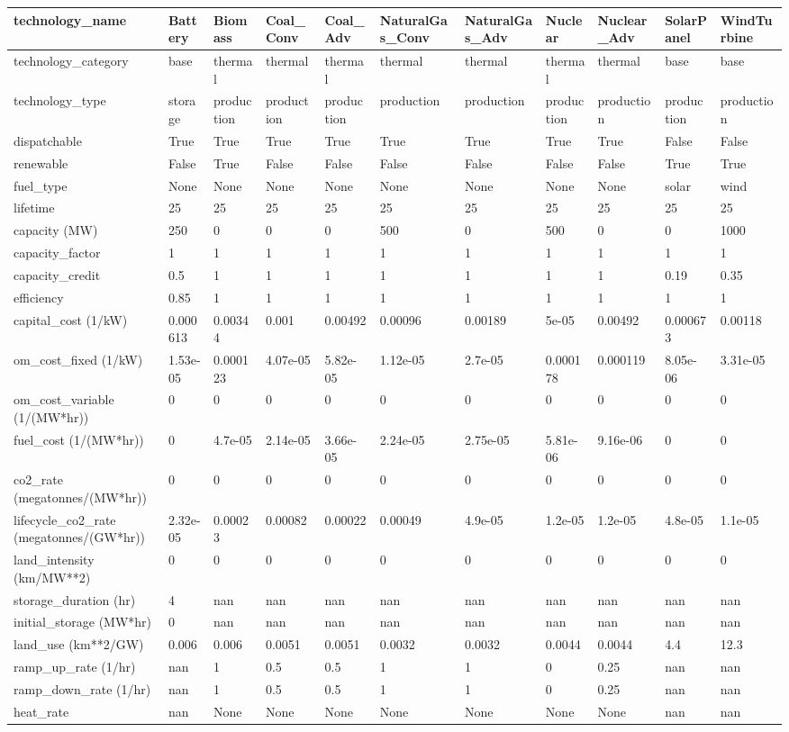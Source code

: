 \begin{tabular}{lllllllllll}
\toprule
technology\_name & Battery & Biomass & Coal\_Conv & Coal\_Adv & NaturalGas\_Conv & NaturalGas\_Adv & Nuclear & Nuclear\_Adv & SolarPanel & WindTurbine \\
\midrule
technology\_category & base & thermal & thermal & thermal & thermal & thermal & thermal & thermal & base & base \\
technology\_type & storage & production & production & production & production & production & production & production & production & production \\
dispatchable & True & True & True & True & True & True & True & True & False & False \\
renewable & False & True & False & False & False & False & False & False & True & True \\
fuel\_type & None & None & None & None & None & None & None & None & solar & wind \\
lifetime & 25 & 25 & 25 & 25 & 25 & 25 & 25 & 25 & 25 & 25 \\
capacity (MW) & 250 & 0 & 0 & 0 & 500 & 0 & 500 & 0 & 0 & 1000 \\
capacity\_factor & 1 & 1 & 1 & 1 & 1 & 1 & 1 & 1 & 1 & 1 \\
capacity\_credit & 0.5 & 1 & 1 & 1 & 1 & 1 & 1 & 1 & 0.19 & 0.35 \\
efficiency & 0.85 & 1 & 1 & 1 & 1 & 1 & 1 & 1 & 1 & 1 \\
capital\_cost (1/kW) & 0.000613 & 0.00344 & 0.001 & 0.00492 & 0.00096 & 0.00189 & 5e-05 & 0.00492 & 0.000673 & 0.00118 \\
om\_cost\_fixed (1/kW) & 1.53e-05 & 0.000123 & 4.07e-05 & 5.82e-05 & 1.12e-05 & 2.7e-05 & 0.000178 & 0.000119 & 8.05e-06 & 3.31e-05 \\
om\_cost\_variable (1/(MW*hr)) & 0 & 0 & 0 & 0 & 0 & 0 & 0 & 0 & 0 & 0 \\
fuel\_cost (1/(MW*hr)) & 0 & 4.7e-05 & 2.14e-05 & 3.66e-05 & 2.24e-05 & 2.75e-05 & 5.81e-06 & 9.16e-06 & 0 & 0 \\
co2\_rate (megatonnes/(MW*hr)) & 0 & 0 & 0 & 0 & 0 & 0 & 0 & 0 & 0 & 0 \\
lifecycle\_co2\_rate (megatonnes/(GW*hr)) & 2.32e-05 & 0.00023 & 0.00082 & 0.00022 & 0.00049 & 4.9e-05 & 1.2e-05 & 1.2e-05 & 4.8e-05 & 1.1e-05 \\
land\_intensity (km/MW**2) & 0 & 0 & 0 & 0 & 0 & 0 & 0 & 0 & 0 & 0 \\
storage\_duration (hr) & 4 & nan & nan & nan & nan & nan & nan & nan & nan & nan \\
initial\_storage (MW*hr) & 0 & nan & nan & nan & nan & nan & nan & nan & nan & nan \\
land\_use (km**2/GW) & 0.006 & 0.006 & 0.0051 & 0.0051 & 0.0032 & 0.0032 & 0.0044 & 0.0044 & 4.4 & 12.3 \\
ramp\_up\_rate (1/hr) & nan & 1 & 0.5 & 0.5 & 1 & 1 & 0 & 0.25 & nan & nan \\
ramp\_down\_rate (1/hr) & nan & 1 & 0.5 & 0.5 & 1 & 1 & 0 & 0.25 & nan & nan \\
heat\_rate & nan & None & None & None & None & None & None & None & nan & nan \\
\bottomrule
\end{tabular}
